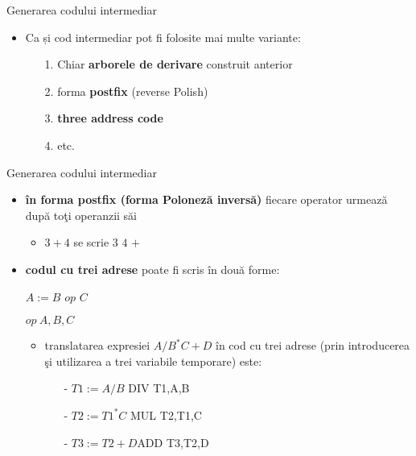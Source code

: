 \documentclass[pdf]{beamer}
\begin{document}
\begin{frame}{Generarea codului intermediar}
\begin{itemize}
\item 
Ca și cod intermediar pot fi folosite mai multe variante:
\begin{itemize}
\item[1.] Chiar \textbf {arborele de derivare} construit anterior
\item[2.] forma \textbf {postfix} (reverse Polish)
\item[3.] \textbf{three address code}
\item[4.] etc.
\end{itemize}
\end{itemize}
\end{frame}



\begin{frame}{Generarea codului intermediar}
\begin{itemize}
\item 
\textbf{în forma postfix (forma Poloneză inversă)} fiecare operator urmează după toţi operanzii săi
\begin{itemize}
\item
$3+4$ se scrie $3$  $4$ $+$
\end{itemize}

\item 
\textbf{codul cu trei adrese} poate fi scris în două forme:

$A := B$ $ op$ $ C$

$op \ A,B,C$

\begin{itemize}
\item
translatarea expresiei $A/B^*C+D$ în cod cu trei adrese (prin introducerea şi utilizarea a trei variabile temporare) este:
\begin{itemize}
\item[-] $T1:=A/B$  \-\hspace{2cm}    DIV \-\hspace{2cm}    T1,A,B
\item[-] $T2:=T1^*C$  \-\hspace{1.8cm}  MUL \-\hspace{2cm}  T2,T1,C
\item[-] $T3:=T2+D$\-\hspace{1.7cm}ADD \-\hspace{2cm} T3,T2,D
\end{itemize}
\end{itemize}
\end{itemize}
\end{frame}
\end{document}
